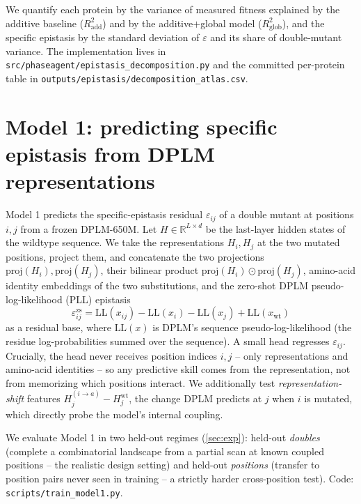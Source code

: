 \documentclass{article}
\newcommand{\eps}{\varepsilon}
\begin{document}
We quantify each protein by the variance of measured fitness explained by the
additive baseline ($R^2_{\text{add}}$) and by the additive$+$global model
($R^2_{\text{glob}}$), and the specific epistasis by the standard deviation of
$\eps$ and its share of double-mutant variance. The implementation lives in
\texttt{src/phaseagent/epistasis\_decomposition.py} and the committed per-protein
table in \texttt{outputs/epistasis/decomposition\_atlas.csv}.

\section{Model 1: predicting specific epistasis from DPLM representations}
\label{sec:model1}

Model 1 predicts the specific-epistasis residual $\eps_{ij}$ of a double mutant
at positions $i,j$ from a frozen DPLM-650M. Let $H \in \mathbb{R}^{L \times d}$ be
the last-layer hidden states of the wildtype sequence. We take the
representations $H_i, H_j$ at the two mutated positions, project them, and
concatenate the two projections $\text{proj}(H_i),\text{proj}(H_j)$, their
bilinear product $\text{proj}(H_i) \odot \text{proj}(H_j)$, amino-acid identity
embeddings of the two substitutions, and the zero-shot
DPLM pseudo-log-likelihood (PLL) epistasis
\begin{equation}
  \label{eq:zs}
  \eps^{\text{zs}}_{ij} = \text{LL}(x_{ij}) - \text{LL}(x_i) - \text{LL}(x_j) + \text{LL}(x_{\text{wt}})
\end{equation}
as a residual base, where $\text{LL}(x)$ is DPLM's sequence pseudo-log-likelihood
(the residue log-probabilities summed over the sequence). A small head regresses $\eps_{ij}$. Crucially, the head never
receives position indices $i,j$ -- only representations and amino-acid identities
-- so any predictive skill comes from the representation, not from memorizing
which positions interact. We additionally test \emph{representation-shift}
features $H^{(i\to a)}_j - H^{\text{wt}}_j$, the change DPLM predicts at $j$ when
$i$ is mutated, which directly probe the model's internal coupling.

We evaluate Model 1 in two held-out regimes (\cref{sec:exp}): held-out
\emph{doubles} (complete a combinatorial landscape from a partial scan at known
coupled positions -- the realistic design setting) and held-out \emph{positions}
(transfer to position pairs never seen in training -- a strictly harder
cross-position test). Code: \texttt{scripts/train\_model1.py}.
\end{document}
